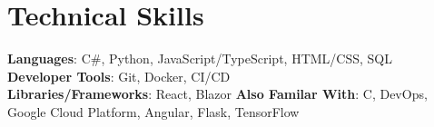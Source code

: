 \documentclass[letterpaper,11pt]{article}
\begin{document}
\section{Technical Skills}
 \begin{itemize}[leftmargin=0.15in, label={}]
    \small{\item{
     \textbf{Languages}{: C\#, Python,  JavaScript/TypeScript, HTML/CSS,  SQL } \\
     \textbf{Developer Tools}{: Git, Docker,  CI/CD } \\
     \textbf{Libraries/Frameworks}{: React, Blazor}}\newline
    \textbf{Also Familar With}{: C, DevOps, Google Cloud Platform, Angular, Flask, TensorFlow }}
 \end{itemize}


\end{document}
